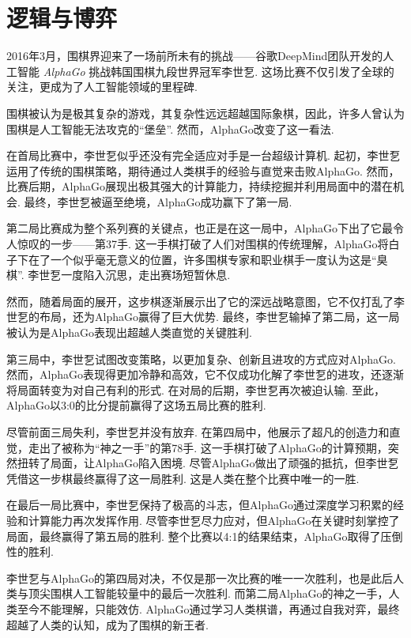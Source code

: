 \chapter{逻辑与博弈}\label{chap:game}

2016年3月，围棋界迎来了一场前所未有的挑战——谷歌DeepMind团队开发的人工智能 \emph{AlphaGo} 挑战韩国围棋九段世界冠军李世乭. 这场比赛不仅引发了全球的关注，更成为了人工智能领域的里程碑. 

围棋被认为是极其复杂的游戏，其复杂性远远超越国际象棋，因此，许多人曾认为围棋是人工智能无法攻克的“堡垒”. 然而，AlphaGo改变了这一看法. 

在首局比赛中，李世乭似乎还没有完全适应对手是一台超级计算机. 起初，李世乭运用了传统的围棋策略，期待通过人类棋手的经验与直觉来击败AlphaGo. 然而，比赛后期，AlphaGo展现出极其强大的计算能力，持续挖掘并利用局面中的潜在机会. 最终，李世乭被逼至绝境，AlphaGo成功赢下了第一局. 

第二局比赛成为整个系列赛的关键点，也正是在这一局中，AlphaGo下出了它最令人惊叹的一步——第37手. 这一手棋打破了人们对围棋的传统理解，AlphaGo将白子下在了一个似乎毫无意义的位置，许多围棋专家和职业棋手一度认为这是“臭棋”. 李世乭一度陷入沉思，走出赛场短暂休息. 

然而，随着局面的展开，这步棋逐渐展示出了它的深远战略意图，它不仅打乱了李世乭的布局，还为AlphaGo赢得了巨大优势. 最终，李世乭输掉了第二局，这一局被认为是AlphaGo表现出超越人类直觉的关键胜利. 

第三局中，李世乭试图改变策略，以更加复杂、创新且进攻的方式应对AlphaGo. 然而，AlphaGo表现得更加冷静和高效，它不仅成功化解了李世乭的进攻，还逐渐将局面转变为对自己有利的形式. 在对局的后期，李世乭再次被迫认输. 至此，AlphaGo以3:0的比分提前赢得了这场五局比赛的胜利. 

尽管前面三局失利，李世乭并没有放弃. 在第四局中，他展示了超凡的创造力和直觉，走出了被称为“神之一手”的第78手. 这一手棋打破了AlphaGo的计算预期，突然扭转了局面，让AlphaGo陷入困境. 尽管AlphaGo做出了顽强的抵抗，但李世乭凭借这一步棋最终赢得了这一局胜利. 这是人类在整个比赛中唯一的一胜. 

在最后一局比赛中，李世乭保持了极高的斗志，但AlphaGo通过深度学习积累的经验和计算能力再次发挥作用. 尽管李世乭尽力应对，但AlphaGo在关键时刻掌控了局面，最终赢得了第五局的胜利. 整个比赛以4:1的结果结束，AlphaGo取得了压倒性的胜利. 

李世乭与AlphaGo的第四局对决，不仅是那一次比赛的唯一一次胜利，也是此后人类与顶尖围棋人工智能较量中的最后一次胜利. 而第二局AlphaGo的神之一手，人类至今不能理解，只能效仿. AlphaGo通过学习人类棋谱，再通过自我对弈，最终超越了人类的认知，成为了围棋的新王者. 

